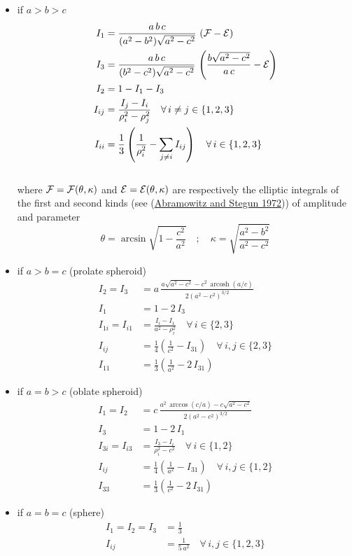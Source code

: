 \documentclass[
  letterpaper,
  DIV=11,
  numbers=noendperiod]{scrreprt}
\providecommand{\tightlist}{%
  \setlength{\itemsep}{0pt}\setlength{\parskip}{0pt}}\usepackage{longtable,booktabs,array}
\begin{document}
\begin{itemize}
\tightlist
\item
  if \(a > b > c\) \[\begin{aligned}
    I_1&=\frac{a\,b\,c}{(a^2-b^2)\sqrt{a^2-c^2}}\,
    \left({\cal F}-{\cal E}\right)\\
    I_3&=\frac{a\,b\,c}{(b^2-c^2)\sqrt{a^2-c^2}}\,
    \left(\frac{b\sqrt{a^2-c^2}}{a\,c}-
    {\cal E}\right)\\
    I_2&=1-I_1-I_3\\
    I_{ij}&=\frac{I_j-I_i}{\rho_i^2-\rho_j^2}\quad\forall\, i\neq j\in\{1,2,3\}\\
    I_{ii}&=\frac{1}{3}\left(
    \frac{1}{\rho_i^2}-
    \sum_{j\neq i}I_{ij} \right) 
    \quad\forall\, i\in\{1,2,3\}
    \end{aligned}\]\\
  where \({\cal F}={\cal F}(\theta,\kappa)\) and
  \({\cal E}={\cal E}(\theta,\kappa)\) are respectively the elliptic
  integrals of the first and second kinds (see
  (\protect\hyperlink{ref-abramowitz1972}{Abramowitz and Stegun 1972}))
  of amplitude and parameter \[
    \theta=\arcsin{\sqrt{1-\frac{c^2}{a^2}}}
    \quad;\quad
    \kappa=\sqrt{\frac{a^2-b^2}{a^2-c^2}}
    \]
\item
  if \(a > b = c\) (prolate spheroid) \[\begin{aligned}
    I_2=I_3&=a\,
    \frac{a\sqrt{a^2-c^2}-c^2\,\mathop{\mathrm{arcosh}}{(a/c)}}
    {2\left(a^2-c^2\right)^{3/2}}\\
    I_1&=1-2\,I_3\\
    I_{1i}=I_{i1}&=\frac{I_i-I_1}{a^2-\rho_i^2}\quad
    \forall\, i\in\{2,3\}\\
    I_{ij}&=\frac{1}{4}
    \left(\frac{1}{c^2}-I_{31} \right) 
    \quad\forall\, i,j\in\{2,3\}\\
    I_{11}&=\frac{1}{3}
    \left(\frac{1}{a^2}-2\,I_{31} \right)
    \end{aligned}\]
\item
  if \(a = b > c\) (oblate spheroid) \[\begin{aligned}
    I_1=I_2&=c\,
    \frac{a^2\,\arccos{(c/a)}-c\sqrt{a^2-c^2}}
    {2\left(a^2-c^2\right)^{3/2}}\\
    I_3&=1-2\,I_1\\
    I_{3i}=I_{i3}&=\frac{I_3-I_i}{\rho_i^2-c^2}\quad
    \forall\, i\in\{1,2\}\\
    I_{ij}&=\frac{1}{4}
    \left(\frac{1}{a^2}-I_{31} \right) 
    \quad\forall\, i,j\in\{1,2\}\\
    I_{33}&=\frac{1}{3}
    \left(\frac{1}{c^2}-2\,I_{31} \right)
    \end{aligned}\]
\item
  if \(a = b = c\) (sphere) \[\begin{aligned}
    I_1=I_2=I_3&=\frac{1}{3}\\
    I_{ij}&=\frac{1}{5\,a^2}\quad\forall\, i,j\in\{1,2,3\}
    \end{aligned}\]
\end{itemize}
\end{document}
